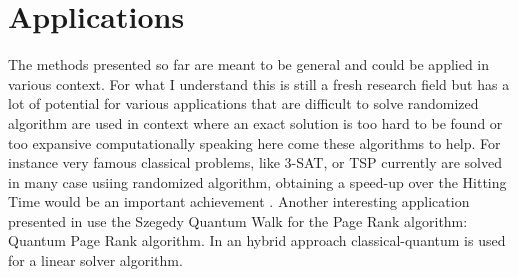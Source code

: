\section{Applications}

The methods presented so far are meant to be general and could be applied in various context. For what I understand this is still a fresh research field 
but has a lot of potential for various applications that are difficult to solve randomized algorithm are used in context where an exact solution is too
hard to be found or too expansive computationally speaking here come these algorithms to help. For instance very famous classical problems, like 3-SAT, 
or TSP currently are solved in many case usiing randomized algorithm, obtaining a speed-up over the Hitting Time would be an important achievement \cite{Kempe_2003}. 
Another interesting application presented in \cite{Loke_2017} use the Szegedy Quantum Walk for the Page Rank algorithm: Quantum Page Rank algorithm. 
In \cite{Chen2019} an hybrid approach classical-quantum is used for a linear solver algorithm.

